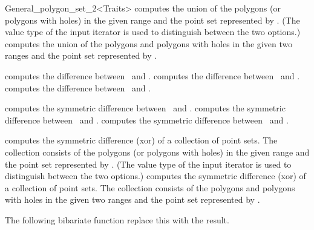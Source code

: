 \begin{ccRefClass}{General_polygon_set_2<Traits>}
  {computes the union of the polygons (or polygons with holes) in the 
   given range and the point set represented by \ccVar. (The value type 
   of the input iterator is used to distinguish between the two options.)}
\ccGlue
{}
  {computes the union of the polygons and polygons with holes in the 
   given two ranges and the point set represented by \ccVar.}

  {computes the difference between \ccVar\ and .}
\ccGlue
{}
  {computes the difference between \ccVar\ and .}
\ccGlue
{}
  {computes the difference between \ccVar\ and .}

  {computes the symmetric difference between \ccVar\ and .}
\ccGlue
{}
  {computes the symmetric difference between \ccVar\ and .}
\ccGlue
{}
  {computes the symmetric difference between \ccVar\ and .}

  {computes the symmetric difference (xor) of a collection of point sets.
   The collection consists of the polygons (or polygons with holes) in the 
   given range and the point set represented by \ccVar. (The value type of 
   the input iterator is used to distinguish between the two options.)}
\ccGlue
{}
  {computes the symmetric difference (xor) of a collection of point sets.
   The collection consists of the polygons and polygons with holes in the
   given two ranges and the point set represented by \ccVar.}

The following bibariate function replace this with the result.


\end{ccRefClass}

